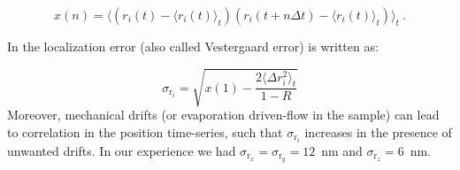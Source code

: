 \begin{equation}
	x(n) =  \langle (r_i(t) - \langle r_i(t) \rangle_t  ) (r_i(t + n\Delta t) - \langle r_i(t) \rangle_t) \rangle_t ~.
\end{equation}

In \cite{vestergaard_estimation_2015} the localization error (also called Vestergaard error) is written as:

\begin{equation}
	\sigma_{\mathrm{r}_i} = \sqrt{x(1) - \frac{2 \langle \Delta r_i^2 \rangle_t }{1-R}}
\end{equation}
Moreover,  mechanical drifts (or evaporation driven-flow in the sample) can lead to correlation in the position time-series, such that $\sigma_{\mathrm{r}_i}$ increases in the presence of unwanted drifts. In our experience we had $\sigma_{\mathrm{r}_x} = \sigma_{\mathrm{r}_y} = 12$~nm and $\sigma_{\mathrm{r}_z} = 6$~nm. 



